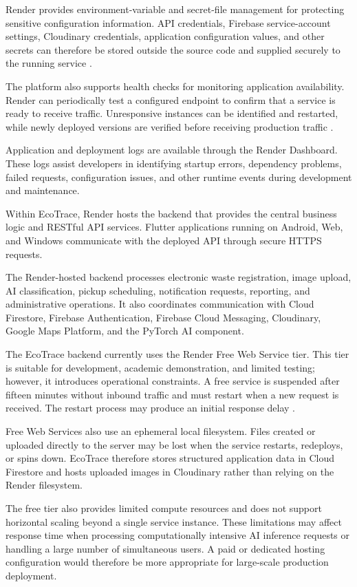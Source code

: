 Render provides environment-variable and secret-file management for
protecting sensitive configuration information. API credentials, Firebase
service-account settings, Cloudinary credentials, application configuration values,
and other secrets can therefore be stored outside the source code and supplied
securely to the running service \citep{render2026envvars}.

The platform also supports health checks for monitoring application
availability. Render can periodically test a configured endpoint to confirm that a
service is ready to receive traffic. Unresponsive instances can be identified and
restarted, while newly deployed versions are verified before receiving production
traffic \citep{render2026healthchecks}.

Application and deployment logs are available through the Render Dashboard.
These logs assist developers in identifying startup errors, dependency problems,
failed requests, configuration issues, and other runtime events during
development and maintenance.

Within EcoTrace, Render hosts the backend that provides the central business
logic and RESTful API services. Flutter applications running on Android, Web, and
Windows communicate with the deployed API through secure HTTPS requests.

The Render-hosted backend processes electronic waste registration, image
upload, AI classification, pickup scheduling, notification requests, reporting, and
administrative operations. It also coordinates communication with Cloud
Firestore, Firebase Authentication, Firebase Cloud Messaging, Cloudinary, Google
Maps Platform, and the PyTorch AI component.

The EcoTrace backend currently uses the Render Free Web Service tier. This
tier is suitable for development, academic demonstration, and limited testing;
however, it introduces operational constraints. A free service is suspended after
fifteen minutes without inbound traffic and must restart when a new request is
received. The restart process may produce an initial response delay
\citep{render2026free}.

Free Web Services also use an ephemeral local filesystem. Files created or
uploaded directly to the server may be lost when the service restarts, redeploys, or
spins down. EcoTrace therefore stores structured application data in Cloud
Firestore and hosts uploaded images in Cloudinary rather than relying on the
Render filesystem.

The free tier also provides limited compute resources and does not support
horizontal scaling beyond a single service instance. These limitations may affect
response time when processing computationally intensive AI inference requests or
handling a large number of simultaneous users. A paid or dedicated hosting
configuration would therefore be more appropriate for large-scale production
deployment.

